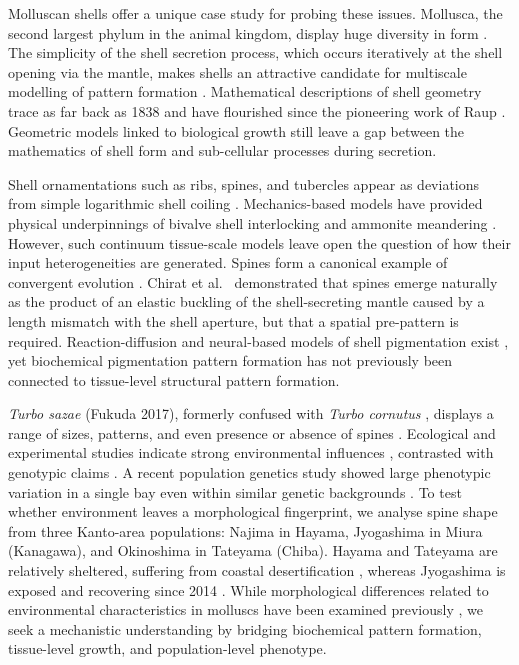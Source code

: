 \documentclass[11pt]{article}
\begin{document}
Molluscan shells offer a unique case study for probing these issues. Mollusca, the second largest phylum in the animal kingdom, display huge diversity in form \citep{ref6}. The simplicity of the shell secretion process, which occurs iteratively at the shell opening via the mantle, makes shells an attractive candidate for multiscale modelling of pattern formation \citep{ref7,ref8}. Mathematical descriptions of shell geometry trace as far back as 1838 \citep{ref9} and have flourished since the pioneering work of Raup \citep{ref10}. Geometric models linked to biological growth \citep{ref11,ref12,ref13} still leave a gap between the mathematics of shell form and sub-cellular processes during secretion.

Shell ornamentations such as ribs, spines, and tubercles appear as deviations from simple logarithmic shell coiling \citep{ref14}. Mechanics-based models have provided physical underpinnings of bivalve shell interlocking \citep{ref15,ref16,ref17,ref18,ref19,ref20,ref21,ref22} and ammonite meandering \citep{ref23}. However, such continuum tissue-scale models leave open the question of how their input heterogeneities are generated. Spines form a canonical example of convergent evolution \citep{ref24}. Chirat et al.\ \citep{ref19} demonstrated that spines emerge naturally as the product of an elastic buckling of the shell-secreting mantle caused by a length mismatch with the shell aperture, but that a spatial pre-pattern is required. Reaction-diffusion and neural-based models of shell pigmentation exist \citep{ref25,ref26,ref27}, yet biochemical pigmentation pattern formation has not previously been connected to tissue-level structural pattern formation.

\textit{Turbo sazae} (Fukuda 2017), formerly confused with \textit{Turbo cornutus} \citep{ref28}, displays a range of sizes, patterns, and even presence or absence of spines \citep{ref14}. Ecological and experimental studies indicate strong environmental influences \citep{ref29,ref30}, contrasted with genotypic claims \citep{ref31}. A recent population genetics study showed large phenotypic variation in a single bay even within similar genetic backgrounds \citep{ref32}. To test whether environment leaves a morphological fingerprint, we analyse spine shape from three Kanto-area populations: Najima in Hayama, Jyogashima in Miura (Kanagawa), and Okinoshima in Tateyama (Chiba). Hayama and Tateyama are relatively sheltered, suffering from coastal desertification \citep{ref33}, whereas Jyogashima is exposed and recovering since 2014 \citep{ref34}. While morphological differences related to environmental characteristics in molluscs have been examined previously \citep{ref35}, we seek a mechanistic understanding by bridging biochemical pattern formation, tissue-level growth, and population-level phenotype.
\end{document}
